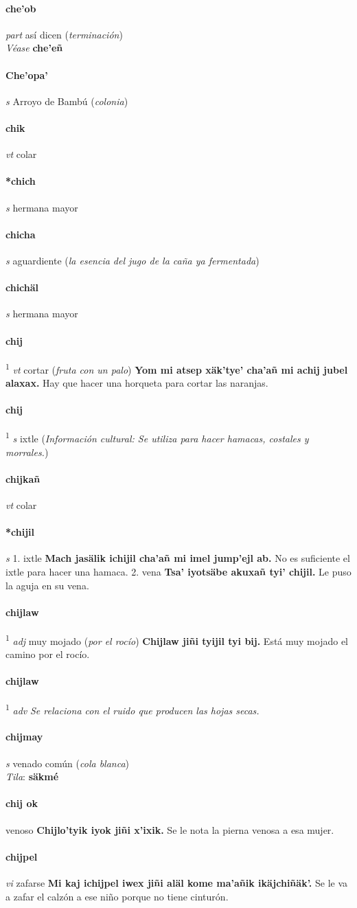 \documentclass{scrbook}
\newcommand{\entry}[1]{\paragraph{#1}}
\newcommand{\onedefinition}[1]{#1.}
\newcommand{\defsuperscript}[1]{\textsuperscript{1}}
\newcommand{\nontranslationdef}[1]{\textit{#1}}
\newcommand{\partofspeech}[1]{\textit{#1}}
\newcommand{\spanishtranslation}[1]{#1}
\newcommand{\clarification}[1]{(\textit{#1})}
\newcommand{\cholexample}[1]{\textbf{#1}}
\newcommand{\exampletranslation}[1]{#1}
\newcommand{\dialectvariant}[1]{\\\textit{#1}:}
\newcommand{\dialectword}[1]{\textbf{#1}}
\newcommand{\alsosee}[1]{\\\textit{Véase} \textbf{#1}}
\newcommand{\culturalinformation}[1]{(\textit{#1})}
\begin{document}
\begin{multicols}{2}
\entry{che'ob}
\partofspeech{part}
\spanishtranslation{así dicen}
\clarification{terminación}
\alsosee{che'eñ}

\entry{Che'opa'}
\partofspeech{s}
\spanishtranslation{Arroyo de Bambú}
\clarification{colonia}

\entry{chik}
\partofspeech{vt}
\spanishtranslation{colar}

\entry{*chich}
\partofspeech{s}
\spanishtranslation{hermana mayor}

\entry{chicha}
\partofspeech{s}
\spanishtranslation{aguardiente}
\clarification{la esencia del jugo de la caña ya fermentada}

\entry{chichäl}
\partofspeech{s}
\spanishtranslation{hermana mayor}

\entry{chij}
\defsuperscript{1}
\partofspeech{vt}
\spanishtranslation{cortar}
\clarification{fruta con un palo}
\cholexample{Yom mi atsep xäk'tye' cha'añ mi achij jubel alaxax.}
\exampletranslation{Hay que hacer una horqueta para cortar las naranjas.}

\entry{chij}
\defsuperscript{2}
\partofspeech{s}
\spanishtranslation{ixtle}
\culturalinformation{Información cultural: Se utiliza para hacer hamacas, costales y morrales.}

\entry{chijkañ}
\partofspeech{vt}
\spanishtranslation{colar}

\entry{*chijil}
\partofspeech{s}
\onedefinition{1}
\spanishtranslation{ixtle}
\cholexample{Mach jasälik ichijil cha'añ mi imel jump'ejl ab.}
\exampletranslation{No es suficiente el ixtle para hacer una hamaca.}
\onedefinition{2}
\spanishtranslation{vena}
\cholexample{Tsa' iyotsäbe akuxañ tyi' chijil.}
\exampletranslation{Le puso la aguja en su vena.}

\entry{chijlaw}
\defsuperscript{1}
\partofspeech{adj}
\spanishtranslation{muy mojado}
\clarification{por el rocío}
\cholexample{Chijlaw jiñi tyijil tyi bij.}
\exampletranslation{Está muy mojado el camino por el rocío.}

\entry{chijlaw}
\defsuperscript{2}
\partofspeech{adv}
\nontranslationdef{Se relaciona con el ruido que producen las hojas secas.}

\entry{chijmay}
\partofspeech{s}
\spanishtranslation{venado común}
\clarification{cola blanca}
\dialectvariant{Tila}
\dialectword{säkmé}

\entry{chij ok}
\spanishtranslation{venoso}
\cholexample{Chijlo'tyik iyok jiñi x'ixik.}
\exampletranslation{Se le nota la pierna venosa a esa mujer.}

\entry{chijpel}
\partofspeech{vi}
\spanishtranslation{zafarse}
\cholexample{Mi kaj ichijpel iwex jiñi aläl kome ma'añik ikäjchiñäk'.}
\exampletranslation{Se le va a zafar el calzón a ese niño porque no tiene cinturón.}


\end{multicols}
\end{document}
